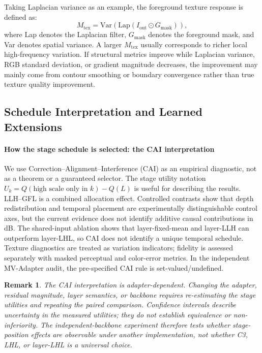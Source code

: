 \documentclass[times,twocolumn,final]{elsarticle}
\newtheorem{remark}{Remark}
\begin{document}
Taking Laplacian variance as an example, the foreground texture response is defined as:
\begin{equation}
M_\text{tex} = \text{Var}(\text{Lap}(I_\text{out} \odot G_\text{mask})),
\end{equation}
where Lap denotes the Laplacian filter, $G_\text{mask}$ denotes the foreground mask, and Var denotes spatial variance. A larger $M_\text{tex}$ usually corresponds to richer local high-frequency variation. If structural metrics improve while Laplacian variance, RGB standard deviation, or gradient magnitude decreases, the improvement may mainly come from contour smoothing or boundary convergence rather than true texture quality improvement.

\subsection{Schedule Interpretation and Learned Extensions}
\label{subsec:cai}

\paragraph{How the stage schedule is selected: the CAI interpretation}
We use Correction--Alignment--Interference (CAI) as an empirical diagnostic, not as a theorem or a guaranteed selector. The stage utility notation $U_k=Q(\text{high scale only in }k)-Q(L)$ is useful for describing the results. LLH--GFL is a combined allocation effect. Controlled contrasts show that depth redistribution and temporal placement are experimentally distinguishable control axes, but the current evidence does not identify additive causal contributions in dB. The shared-input ablation shows that layer-fixed-mean and layer-LLH can outperform layer-LHL, so CAI does not identify a unique temporal schedule. Texture diagnostics are treated as variation indicators; fidelity is assessed separately with masked perceptual and color-error metrics. In the independent MV-Adapter audit, the pre-specified CAI rule is set-valued/undefined.

\begin{remark}
The CAI interpretation is adapter-dependent. Changing the adapter, residual magnitude, layer semantics, or backbone requires re-estimating the stage utilities and repeating the paired comparison. Confidence intervals describe uncertainty in the measured utilities; they do not establish equivalence or non-inferiority. The independent-backbone experiment therefore tests whether stage-position effects are observable under another implementation, not whether C3, LHL, or layer-LHL is a universal choice.
\end{remark}
\end{document}
